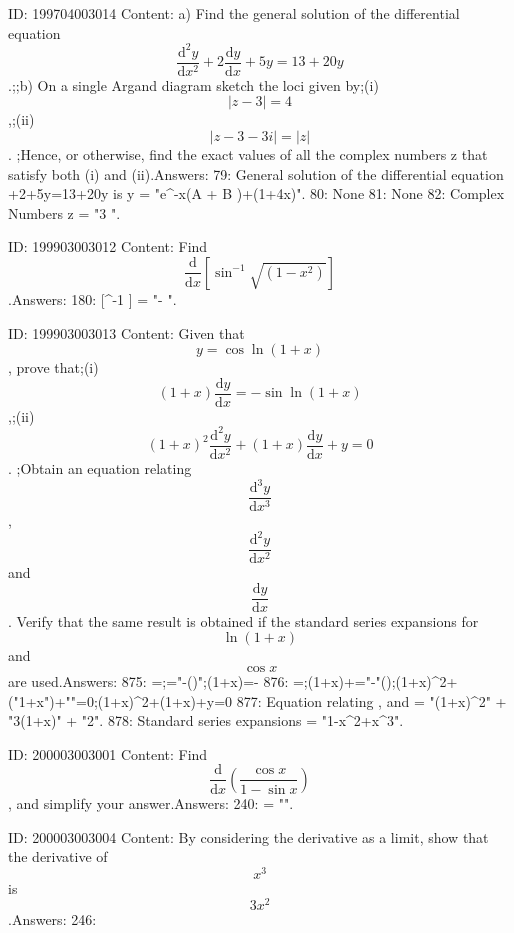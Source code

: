 \documentclass{article}
\begin{document}
ID: 199704003014
Content:
a) Find the general solution of the differential equation \[\frac{\mathrm{d}^{2} y}{\mathrm{d} x^{2}} + 2 \frac{\mathrm{d} y}{\mathrm{d} x} + 5y = 13 + 20y\].;;b) On a single Argand diagram sketch the loci given by;(i) \[|z - 3| = 4\],;(ii) \[|z - 3 - 3i| = |z|\]. ;Hence, or otherwise, find the exact values of all the complex numbers z that satisfy both (i) and (ii).Answers:
79: General solution of the differential equation +2+5y=13+20y is y = "e^{-x}(A  + B )+(1+4x)".
80: None
81: None
82: Complex Numbers z = "3  ".

ID: 199903003012
Content:
Find \[\frac{\mathrm{d} }{\mathrm{d} x}[\sin ^{-1} \sqrt{(1 - x^2)}]\].Answers:
180:  [\sin^{-1} ] = "- ".

ID: 199903003013
Content:
Given that \[y = \cos {\ln(1 + x)}\], prove that;(i) \[(1 + x)\frac{\mathrm{d} y}{\mathrm{d} x} = - \sin {\ln(1 + x)}\],;(ii) \[(1 + x)^2 \frac{\mathrm{d}^2 y}{\mathrm{d} x^2} + (1 + x)\frac{\mathrm{d} y}{\mathrm{d} x} + y = 0\]. ;Obtain an equation relating \[\frac{\mathrm{d}^3 y}{\mathrm{d} x^3}\], \[\frac{\mathrm{d}^2 y}{\mathrm{d} x^2}\] and \[\frac{\mathrm{d} y}{\mathrm{d} x}\]. Verify that the same result is obtained if the standard series expansions for \[\ln (1 + x)\] and \[\cos x\] are used.Answers:
875: =;="-\left(\right)";\therefore \left(1+x\right)=-
876: =;\left(1+x\right)+="-"\left(\right);{{\left(1+x\right)}^{2}}+("1+x")+""=0;{{\left(1+x\right)}^{2}}+\left(1+x\right)+y=0
877: Equation relating ,  and  = "(1+x)^2" + "3(1+x)" + "2".
878: Standard series expansions = "1-x^2+x^3".

ID: 200003003001
Content:
Find \[\frac{\mathrm{d} }{\mathrm{d} x} (\frac {\cos x}{1 - \sin x})\], and simplify your answer.Answers:
240:   = "".

ID: 200003003004
Content:
By considering the derivative as a limit, show that the derivative of \[x^3\] is \[3x^2\].Answers:
246: 
\end{document}
